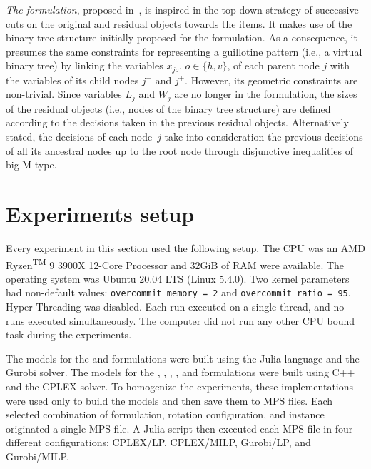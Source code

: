 \emph{The {\modelOrigami} formulation}, proposed in~\citet{martin:2020:top}, is inspired in the top-down strategy of successive cuts on the original and residual objects towards the items.
It makes use of the binary tree structure initially proposed for the {\modelHierarchical} formulation.
As a consequence, it presumes the same constraints for representing a guillotine pattern (i.e., a virtual binary tree) by linking the variables \(x_{jo}\), \(o \in \{h,v\}\), of each parent node \(j\) with the variables of its child nodes \(j^-\) and \(j^+\).
However, its geometric constraints are non-trivial.
Since variables \(L_j\) and \(W_j\) are no longer in the formulation, the sizes of the residual objects (i.e., nodes of the binary tree structure) are defined according to the decisions taken in the previous residual objects.
Alternatively stated, the decisions of each node~\(j\) take into consideration the previous decisions of all its ancestral nodes up to the root node through disjunctive inequalities of big-M type.

\section{Experiments setup}
\label{sec:setup_other_formulations}

Every experiment in this section used the following setup.
The CPU was an AMD\textsuperscript{\textregistered} Ryzen\textsuperscript{TM} 9 3900X 12-Core Processor %
and 32GiB of RAM were available. %
The operating system was Ubuntu 20.04 LTS (Linux 5.4.0).
Two kernel parameters had non-default values: \texttt{overcommit_memory = 2} and \texttt{overcommit_ratio = 95}.
Hyper-Threading was disabled.
Each run executed on a single thread, and no runs executed simultaneously.
The computer did not run any other CPU bound task during the experiments.

The models for the {\modelBecker} and {\modelFMT} formulations were built using the Julia language and the Gurobi solver.
The models for the {\modelBCE}, {\modelGrid}, {\modelHierarchical}, {\modelImplicit}, and {\modelOrigami} formulations were built using C++ and the CPLEX solver.
To homogenize the experiments, these implementations were used only to build the models and then save them to MPS files.
Each selected combination of formulation, rotation configuration, and instance originated a single MPS file.
A Julia script then executed each MPS file in four different configurations: CPLEX/LP, CPLEX/MILP, Gurobi/LP, and Gurobi/MILP.

